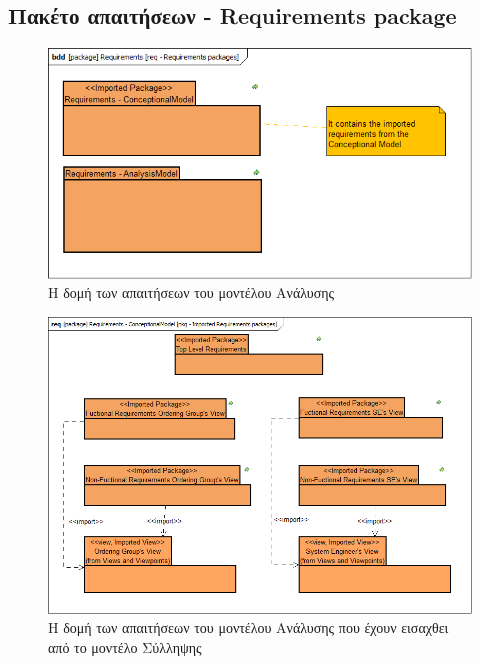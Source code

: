 \documentclass[a4paper,12pt,twoside]{report}
\begin{document}
\begin{appendices}
			\FloatBarrier
			\subsection{Πακέτο απαιτήσεων - Requirements package}

			\clearpage
			\begin{figure}[hp]
					\centering
					\includegraphics[scale=0.30]{AnalysisModel_req-Requirementspackages.png}
					\caption{Η δομή των απαιτήσεων του μοντέλου Ανάλυσης}
					\label{φωτ:Η δομή των απαιτήσεων του μοντέλου Ανάλυσης}
			\end{figure}
			
			\begin{figure}[hp]
					\centering
					\includegraphics[scale=0.30]{AnalysisModel_pkg-ImportedRequirementspackages.png}
					\caption{Η δομή των απαιτήσεων του μοντέλου Ανάλυσης που έχουν εισαχθει από το μοντέλο Σύλληψης}
					\label{φωτ:Η δομή των απαιτήσεων του μοντέλου Ανάλυσης που έχουν εισαχθει από το μοντέλο Σύλληψης}
			\end{figure}
			

\end{appendices}
\end{document}
